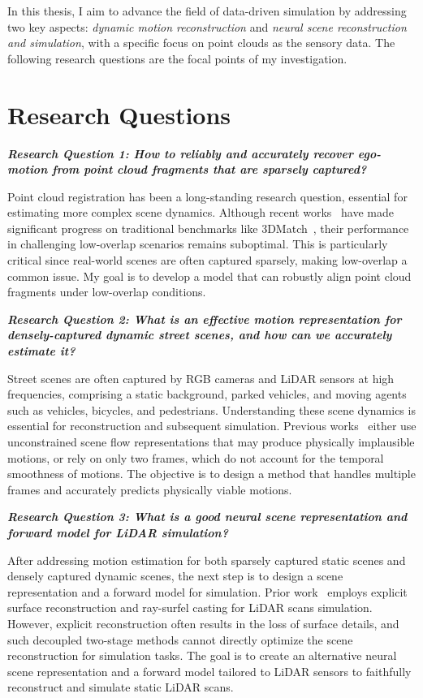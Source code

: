 In this thesis, I aim to advance the field of data-driven simulation by addressing two key aspects: \textit{dynamic motion reconstruction} and \textit{neural scene reconstruction and simulation}, with a specific focus on point clouds as the sensory data. The following research questions are the focal points of my investigation.

\section{Research Questions}
\noindent
\textbf{\textit{Research Question 1: How to reliably and accurately recover ego-motion from point cloud fragments that are sparsely captured?}}

Point cloud registration has been a long-standing research question, essential for estimating more complex scene dynamics. Although recent works~\cite{gojcic2018learned,Choy2019FCGF} have made significant progress on traditional benchmarks like 3DMatch~\cite{zeng20163dmatch}, their performance in challenging low-overlap scenarios remains suboptimal. This is particularly critical since real-world scenes are often captured sparsely, making low-overlap a common issue. My goal is to develop a model that can robustly align point cloud fragments under low-overlap conditions.

\noindent
\textbf{\textit{Research Question 2: What is an effective motion representation for densely-captured dynamic street scenes, and how can we accurately estimate it?}}

Street scenes are often captured by RGB cameras and LiDAR sensors at high frequencies, comprising a static background, parked vehicles, and moving agents such as vehicles, bicycles, and pedestrians. Understanding these scene dynamics is essential for reconstruction and subsequent simulation. Previous works~\cite{li2020neural,gojcic2021weakly} either use unconstrained scene flow representations that may produce physically implausible motions, or rely on only two frames, which do not account for the temporal smoothness of motions. The objective is to design a method that handles multiple frames and accurately predicts physically viable motions.

\noindent
\textbf{\textit{Research Question 3: What is a good neural scene representation and forward model for LiDAR simulation?}}

After addressing motion estimation for both sparsely captured static scenes and densely captured dynamic scenes, the next step is to design a scene representation and a forward model for simulation. Prior work~\cite{manivasagam2020lidarsim} employs explicit surface reconstruction and ray-surfel casting for LiDAR scans simulation. However, explicit reconstruction often results in the loss of surface details, and such decoupled two-stage methods cannot directly optimize the scene reconstruction for simulation tasks. The goal is to create an alternative neural scene representation and a forward model tailored to LiDAR sensors to faithfully reconstruct and simulate static LiDAR scans.

